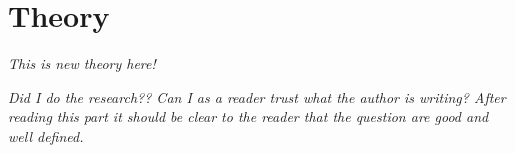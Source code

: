 \chapter{Theory}\label{cha:theory}

\textit{This is new theory here!}

\textit{Did I do the research?? Can I as a reader trust what the author is writing? After reading this part it should be clear to the reader that the question are good and well defined.}


%



